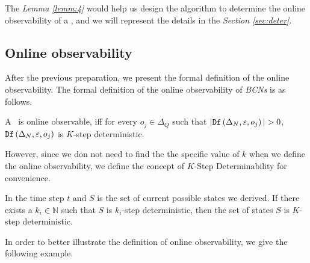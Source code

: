 The {\em Lemma \ref{lemm:4}} would help us design the algorithm to determine the online observability of a \BCN, and we will represent the details in the {\em Section \ref{sec:deter}}.


\subsection{Online observability}
After the previous preparation, we present the formal definition of the online observability. The formal definition of the online observability of {\em BCNs} is as follows.

\begin{definition}
 A \BCN\ is online observable,
iff for every  $o_j \in \Delta_Q$ such that $|\Ded\left(\Delta_N,\varepsilon, o_j\right)|> 0$,  ${\tt Df}\left(\Delta_N,\varepsilon,o_j\right)$ is $K$-step deterministic.
\end{definition}

However, since we don not need to find the the specific value of $k$ when we define the online observability, we define the concept of $K$-Step Determinability for convenience.
\begin{definition} 
 In the time step $t$ and $S$ is the set of current possible states we derived. If there exists a $k_i\in \mathbb{N}$ such that $S$ is $k_i$-step deterministic, then the set of states $S$ is $K$-step deterministic.
\end{definition}

 In order to better illustrate the definition of online observability, we give the following example.

